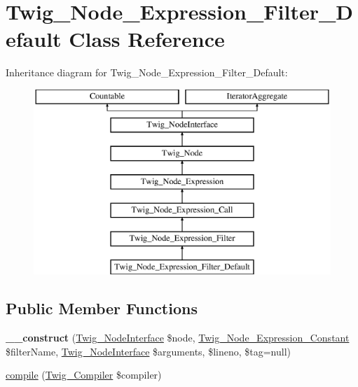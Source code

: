 \hypertarget{class_twig___node___expression___filter___default}{}\section{Twig\+\_\+\+Node\+\_\+\+Expression\+\_\+\+Filter\+\_\+\+Default Class Reference}
\label{class_twig___node___expression___filter___default}
Inheritance diagram for Twig\+\_\+\+Node\+\_\+\+Expression\+\_\+\+Filter\+\_\+\+Default\+:\begin{figure}[H]
\begin{center}
\leavevmode
\includegraphics[height=7.000000cm]{class_twig___node___expression___filter___default}
\end{center}
\end{figure}
\subsection*{Public Member Functions}
\begin{DoxyCompactItemize}
\item 
\hypertarget{class_twig___node___expression___filter___default_a71feda7cd9ef9a14a271f02222d6c9b6}{}{\bfseries \+\_\+\+\_\+construct} (\hyperlink{interface_twig___node_interface}{Twig\+\_\+\+Node\+Interface} \$node, \hyperlink{class_twig___node___expression___constant}{Twig\+\_\+\+Node\+\_\+\+Expression\+\_\+\+Constant} \$filter\+Name, \hyperlink{interface_twig___node_interface}{Twig\+\_\+\+Node\+Interface} \$arguments, \$lineno, \$tag=null)\label{class_twig___node___expression___filter___default_a71feda7cd9ef9a14a271f02222d6c9b6}

\item 
\hyperlink{class_twig___node___expression___filter___default_a4e0faa87c3fae583620b84d3607085da}{compile} (\hyperlink{class_twig___compiler}{Twig\+\_\+\+Compiler} \$compiler)
\end{DoxyCompactItemize}
